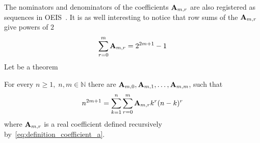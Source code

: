 The nominators and denominators of the coefficients ${\mathbf{A}} \sb{m,r}$ are also registered as sequences
in OEIS~\cite{kolosov2018numerator,kolosov2018denominator}.
It is as well interesting to notice that row sums of the ${\mathbf{A}} \sb{m,r}$ give powers of $2$
\begin{equation*}
    \sum_{r=0}^{m} {\mathbf{A}} \sb{m,r} = 2^{2m+1} - 1
\end{equation*}
Let be a theorem
\begin{thm}
    For every $n\geq 1, \; n,m\in\mathbb{N}$ there are ${\mathbf{A}} \sb{m,0}, {\mathbf{A}} \sb{m,1},\dots,{\mathbf{A}} \sb{m,m}$,
    such that
    \begin{equation*}
        n^{2m+1} = \sum_{k=1}^{n}\sum_{r=0}^{m} {\mathbf{A}} \sb{m,r} k^r (n-k)^r
        \label{eq:odd-power-theorem}
    \end{equation*}
    where ${\mathbf{A}} \sb{m,r}$ is a real coefficient defined recursively by~\eqref{eq:definition_coefficient_a}.
\end{thm}
